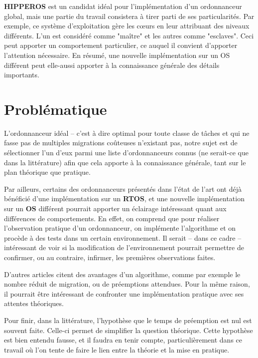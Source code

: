 \documentclass[11pt,a4paper,oneside]{report}
\begin{document}
	\textbf{HIPPEROS} est un candidat idéal pour l'implémentation d'un ordonnanceur 
	global, mais une partie du travail consistera à tirer parti de ses particularités. 
	Par exemple, ce système d'exploitation gère les c\oe{}urs en leur attribuant des 
	niveaux différents. L'un est considéré comme "maître" et les autres comme "esclaves". 
	Ceci peut apporter un comportement particulier, ce auquel il convient d'apporter 
	l'attention nécessaire. En résumé, une nouvelle implémentation sur un OS différent 
	peut elle-aussi apporter à la connaissance générale des détails importants.
	
	
	\section{Problématique}
	L'ordonnanceur idéal -- c'est à dire optimal pour toute classe de tâches et 
	qui ne fasse pas de multiples migrations coûteuses n'existant pas, 
	notre sujet est de sélectionner l'un d'eux parmi une liste 
	d'ordonnanceurs connus (ne serait-ce que dans la littérature) afin que cela apporte 
	à la connaissance générale, tant sur le plan théorique que pratique.\medskip
	
	Par ailleurs, certains des ordonnanceurs présentés dans l'état de l'art 
	ont déjà bénéficié d'une implémentation sur un \textbf{RTOS}, et une nouvelle 
	implémentation sur un \textbf{OS} différent pourrait apporter un éclairage intéressant quant 
	aux différences de comportements.
	En effet, on comprend que pour réaliser l'observation pratique d'un ordonnanceur, 
	on implémente l'algorithme et on procède à des tests dans un certain environnement. 
	Il serait -- dans ce cadre -- intéressant de voir si la modification de l'environnement 
	pourrait permettre de confirmer, ou au contraire, infirmer, les premières observations faites.
	
	D'autres articles citent des avantages d'un algorithme, comme par exemple 
	le nombre réduit de migration, ou de préemptions attendues. Pour la même raison, 
	il pourrait être intéressant de confronter une implémentation pratique avec ses attentes 
	théoriques.\medskip
	
	Pour finir, dans la littérature, l'hypothèse que le temps de préemption est nul 
	est souvent faite. Celle-ci permet de simplifier la question théorique. 
	Cette hypothèse est bien entendu fausse, et il faudra en tenir compte, 
	particulièrement dans ce travail où l'on tente de faire 
	le lien entre la théorie et la mise en pratique.\medskip
	
\end{document}
